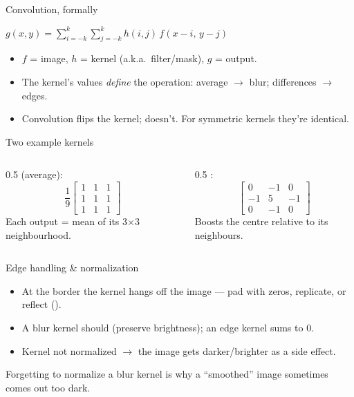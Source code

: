 \documentclass[10pt,aspectratio=169]{beamer}
\begin{document}
\begin{frame}{Convolution, formally}
  \begin{mathbox}
    $g(x,y) = \displaystyle\sum_{i=-k}^{k}\sum_{j=-k}^{k} h(i,j)\, f(x-i,\,y-j)$
  \end{mathbox}
  \begin{itemize}
    \item $f$ = image, $h$ = kernel (a.k.a.\ filter/mask), $g$ = output.
    \item The kernel's values \emph{define} the operation: average $\rightarrow$ blur; differences $\rightarrow$ edges.
    \item Convolution flips the kernel;  doesn't. For symmetric kernels they're identical.
  \end{itemize}
\end{frame}

\begin{frame}{Two example kernels}
  \begin{columns}[T]
    \begin{column}{0.5\textwidth}
       (average):
      \[
      \frac{1}{9}\begin{bmatrix}1&1&1\\1&1&1\\1&1&1\end{bmatrix}
      \]
      Each output = mean of its 3$\times$3 neighbourhood.
    \end{column}
    \begin{column}{0.5\textwidth}
      :
      \[
      \begin{bmatrix}0&-1&0\\-1&5&-1\\0&-1&0\end{bmatrix}
      \]
      Boosts the centre relative to its neighbours.
    \end{column}
  \end{columns}
  \vspace{4pt}
\end{frame}

\begin{frame}{Edge handling \& normalization}
  \begin{itemize}
    \item At the border the kernel hangs off the image — pad with zeros, replicate, or reflect ().
    \item A blur kernel should  (preserve brightness); an edge kernel sums to 0.
    \item Kernel not normalized $\rightarrow$ the image gets darker/brighter as a side effect.
  \end{itemize}
  \begin{badbox}
    Forgetting to normalize a blur kernel is why a ``smoothed'' image sometimes comes out too dark.
  \end{badbox}
\end{frame}
\end{document}

